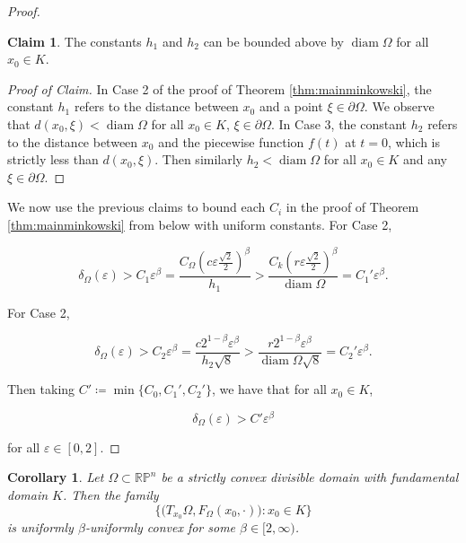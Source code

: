 \documentclass[letterpaper, 11pt, reqno]{amsart}
\DeclareMathOperator{\diamop}{diam}
\newtheorem{cor}[thm]{Corollary}
\theoremstyle{definition}
\newtheorem{claim}[thm]{Claim}
\begin{document}
\begin{proof}
\begin{claim}
    The constants $h_1$ and $h_2$ can be bounded above by $\diamop \Omega$ for all $x_0 \in K$.
\end{claim}

\begin{proof}[Proof of Claim]
    In Case 2 of the proof of Theorem \ref{thm:mainminkowski}, the constant $h_1$ refers to the distance between $x_0$ and a point $\xi \in \partial \Omega$. We observe that $d(x_0, \xi) < \diamop \Omega$ for all $x_0 \in K$, $\xi \in \partial \Omega$. In Case 3, the constant $h_2$ refers to the distance between $x_0$ and the piecewise function $f(t)$ at $t=0$, which is strictly less than $ d(x_0, \xi)$. Then similarly $h_2 < \diamop \Omega$ for all $x_0 \in K$ and any $\xi \in \partial \Omega$.
\end{proof}

We now use the previous claims to bound each $C_i$ in the proof of Theorem \ref{thm:mainminkowski} from below with uniform constants. For Case 2,

\begin{equation}
    \delta_\Omega (\varepsilon) > C_1\varepsilon^\beta = \frac{C_\Omega(c\varepsilon\frac{\sqrt{2}}{2})^\beta}{h_1} > \frac{C_k(r \varepsilon\frac{\sqrt{2}}{2})^\beta}{\diamop \Omega} = C_1'\varepsilon^\beta .
\end{equation}

For Case 2,

\begin{equation*}
    \delta_\Omega (\varepsilon) > C_2\varepsilon^\beta =  \frac{c2^{1-\beta}\varepsilon^\beta}{h_2\sqrt{8}} > \frac{r2^{1-\beta}\varepsilon^\beta}{\diamop \Omega \sqrt{8}} = C_2'\varepsilon^\beta.
\end{equation*}

Then taking $C' \coloneq \min \{C_0, C_1', C_2' \}$, we have that for all $x_0 \in K$,

\begin{equation}\label{uniformC}
    \delta_\Omega (\varepsilon) > C'\varepsilon^\beta
\end{equation}

for all $\varepsilon \in [0,2]$.
\end{proof}

\begin{cor}\label{ubucFinsler}
    Let $\Omega \subset \mathbb{RP}^n$ be a strictly convex divisible domain with fundamental domain $K$.
    Then the family 
\begin{equation}
  \biggl\{ \big(T_{x_0}\Omega, F_\Omega(x_0, \cdot)\big): x_0 \in K \biggl\}
\end{equation} is uniformly $\beta$-uniformly convex for some $\beta \in [2, \infty)$.
\end{cor}
\end{document}

